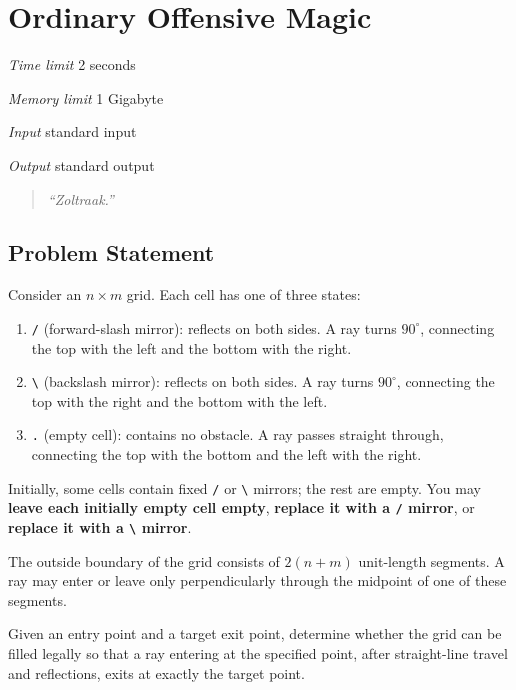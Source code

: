 \section[H. Ordinary Offensive Magic]{ Ordinary Offensive Magic}

\textit{Time limit}   2 seconds

\textit{Memory limit} 1 Gigabyte

\textit{Input} \qquad standard input

\textit{Output} \qquad standard output


\begin{quote}
	\textit{``Zoltraak.''}
\end{quote}

\subsection{Problem Statement}

Consider an $n \times m$ grid. Each cell has one of three states:

\begin{enumerate}
	\item \texttt{/} (forward-slash mirror): reflects on both sides. A ray turns $90^\circ$, connecting the top with the left and the bottom with the right.
	\item \texttt{\textbackslash} (backslash mirror): reflects on both sides. A ray turns $90^\circ$, connecting the top with the right and the bottom with the left.
	\item \texttt{.} (empty cell): contains no obstacle. A ray passes straight through, connecting the top with the bottom and the left with the right.
\end{enumerate}

Initially, some cells contain fixed \texttt{/} or \texttt{\textbackslash} mirrors; the rest are empty. You may \textbf{leave each initially empty cell empty}, \textbf{replace it with a \texttt{/} mirror}, or \textbf{replace it with a \texttt{\textbackslash} mirror}.

The outside boundary of the grid consists of $2(n+m)$ unit-length segments. A ray may enter or leave only perpendicularly through the midpoint of one of these segments.

Given an entry point and a target exit point, determine whether the grid can be filled legally so that a ray entering at the specified point, after straight-line travel and reflections, exits at exactly the target point.

